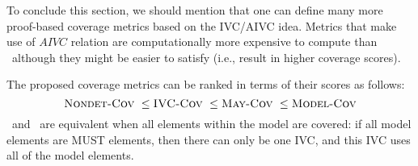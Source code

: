 
To conclude this section, we should mention that one can define many more proof-based coverage metrics based on the IVC/AIVC idea. Metrics that make use of $AIVC$ relation are computationally more expensive to compute than \ivccov\ although they might be easier to satisfy (i.e., result in higher coverage scores).

The proposed coverage metrics can be ranked in terms of their scores as follows:
$$\text{\sc Nondet-Cov}\ \leq \text{\sc IVC-Cov}\ \leq \text{\sc May-Cov}\ \leq \text{\sc Model-Cov}$$
\ivccov\ and \nondetcov\ are equivalent when all elements within the model are covered: if all model elements are MUST elements, then there can only be one IVC, and this IVC uses all of the model elements.


